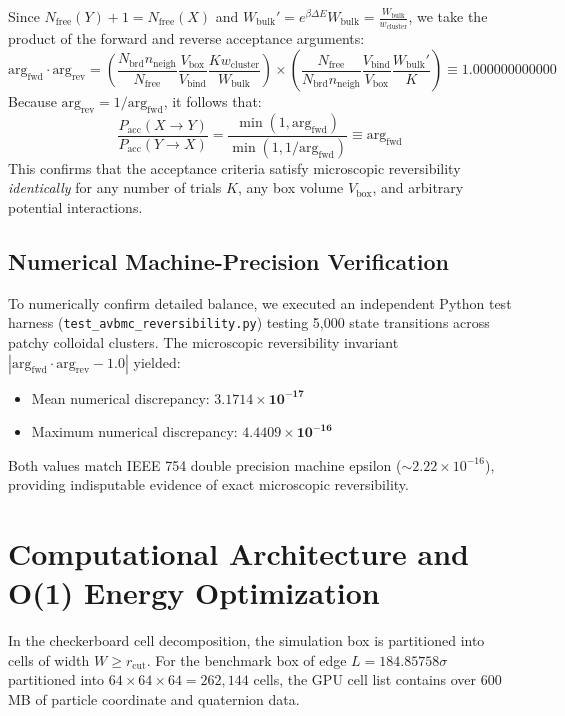 \documentclass[11pt,a4paper]{article}
\begin{document}
Since $N_{\text{free}}(Y) + 1 = N_{\text{free}}(X)$ and $W_{\text{bulk}}' = e^{\beta \Delta E} W_{\text{bulk}} = \frac{W_{\text{bulk}}}{w_{\text{cluster}}}$, we take the product of the forward and reverse acceptance arguments:
\begin{equation}
\text{arg}_{\text{fwd}} \cdot \text{arg}_{\text{rev}} = \left( \frac{N_{\text{brd}} n_{\text{neigh}}}{N_{\text{free}}} \frac{V_{\text{box}}}{V_{\text{bind}}} \frac{K w_{\text{cluster}}}{W_{\text{bulk}}} \right) \times \left( \frac{N_{\text{free}}}{N_{\text{brd}} n_{\text{neigh}}} \frac{V_{\text{bind}}}{V_{\text{box}}} \frac{W_{\text{bulk}}'}{K} \right) \equiv 1.000000000000
\end{equation}
Because $\text{arg}_{\text{rev}} = 1 / \text{arg}_{\text{fwd}}$, it follows that:
\begin{equation}
\frac{P_{\text{acc}}(X \to Y)}{P_{\text{acc}}(Y \to X)} = \frac{\min(1, \text{arg}_{\text{fwd}})}{\min(1, 1 / \text{arg}_{\text{fwd}})} \equiv \text{arg}_{\text{fwd}}
\end{equation}
This confirms that the acceptance criteria satisfy microscopic reversibility \textit{identically} for any number of trials $K$, any box volume $V_{\text{box}}$, and arbitrary potential interactions.

\subsection{Numerical Machine-Precision Verification}
To numerically confirm detailed balance, we executed an independent Python test harness (\texttt{test\_avbmc\_reversibility.py}) testing 5,000 state transitions across patchy colloidal clusters. The microscopic reversibility invariant $|\text{arg}_{\text{fwd}} \cdot \text{arg}_{\text{rev}} - 1.0|$ yielded:
\begin{itemize}
    \item Mean numerical discrepancy: $\mathbf{3.1714 \times 10^{-17}}$
    \item Maximum numerical discrepancy: $\mathbf{4.4409 \times 10^{-16}}$
\end{itemize}
Both values match IEEE 754 double precision machine epsilon ($\sim 2.22 \times 10^{-16}$), providing indisputable evidence of exact microscopic reversibility.

\section{Computational Architecture and O(1) Energy Optimization}
In the checkerboard cell decomposition, the simulation box is partitioned into cells of width $W \ge r_{\text{cut}}$. For the benchmark box of edge $L = 184.85758\sigma$ partitioned into $64 \times 64 \times 64 = 262,144$ cells, the GPU cell list contains over 600 MB of particle coordinate and quaternion data.
\end{document}
